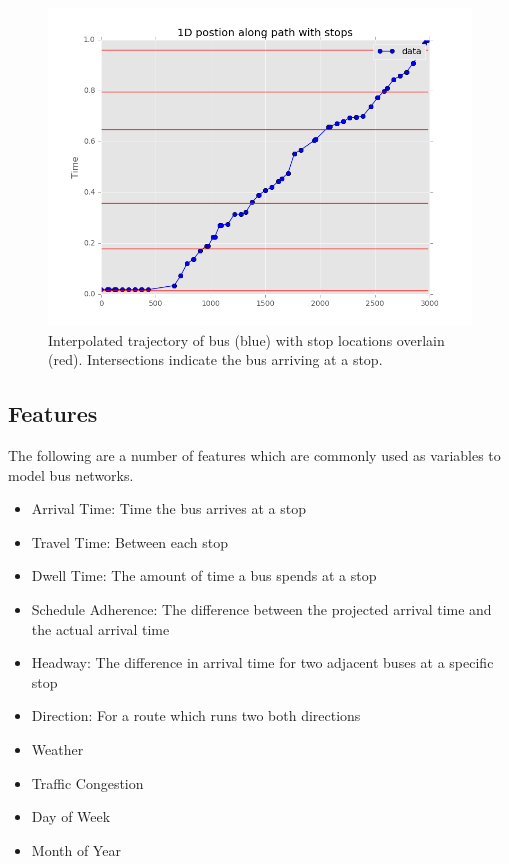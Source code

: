 \begin{figure}
\includegraphics[width=\linewidth]{images/interpolate.png}
\caption{Interpolated trajectory of bus (blue) with stop locations overlain (red). Intersections indicate the bus arriving at a stop.}
\label{interpolate}
\end{figure}
\clearpage
\newpage

\subsection{Features}

The following are a number of features which are commonly used as variables to model bus networks.

\begin{itemize}
  \item Arrival Time: Time the bus arrives at a stop
  \item Travel Time: Between each stop
  \item Dwell Time: The amount of time a bus spends at a stop
  \item Schedule Adherence: The difference between the projected arrival time and the actual arrival time
  \item Headway: The difference in arrival time for two adjacent buses at a specific stop
  \item Direction: For a route which runs two both directions
  \item Weather
  \item Traffic Congestion
  \item Day of Week
  \item Month of Year
\end{itemize}

